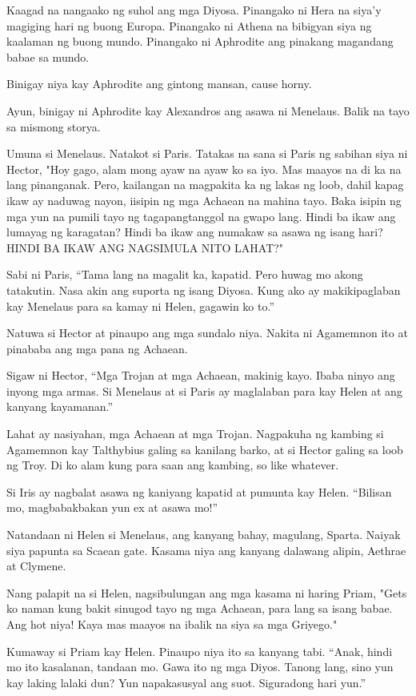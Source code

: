 \documentclass[12pt,letterpaper]{report}
\begin{document}
Kaagad na nangaako ng suhol ang mga Diyosa. Pinangako ni Hera na siya'y magiging hari ng buong Europa. Pinangako ni Athena na bibigyan siya ng kaalaman ng buong mundo. Pinangako ni Aphrodite ang pinakang magandang babae sa mundo.

Binigay niya kay Aphrodite ang gintong mansan, cause horny.

Ayun, binigay ni Aphrodite kay Alexandros ang asawa ni Menelaus. Balik na tayo sa mismong storya.

Umuna si Menelaus. Natakot si Paris. Tatakas na sana si Paris ng sabihan siya ni Hector, "Hoy gago, alam mong ayaw na ayaw ko sa iyo. Mas maayos na di ka na lang pinanganak. Pero, kailangan na magpakita ka ng lakas ng loob, dahil kapag ikaw ay naduwag nayon, iisipin ng mga Achaean na mahina tayo. Baka isipin ng mga yun na pumili tayo ng tagapangtanggol na gwapo lang. Hindi ba ikaw ang lumayag ng karagatan? Hindi ba ikaw ang numakaw sa asawa ng isang hari?
HINDI BA IKAW ANG NAGSIMULA NITO LAHAT?"

Sabi ni Paris, ``Tama lang na magalit ka, kapatid. Pero huwag mo akong tatakutin. Nasa akin ang suporta ng isang Diyosa. Kung ako ay makikipaglaban kay Menelaus para sa kamay ni Helen, gagawin ko to.''

Natuwa si Hector at pinaupo ang mga sundalo niya. Nakita ni Agamemnon ito at pinababa ang mga pana ng Achaean.

Sigaw ni Hector, ``Mga Trojan at mga Achaean, makinig kayo. Ibaba ninyo ang inyong mga armas. Si Menelaus at si Paris ay maglalaban para kay Helen at ang kanyang kayamanan.''

Lahat ay nasiyahan, mga Achaean at mga Trojan. Nagpakuha ng kambing si Agamemnon kay Talthybius galing sa kanilang barko, at si Hector galing sa loob ng Troy. Di ko alam kung para saan ang kambing, so like whatever.

Si Iris ay nagbalat asawa ng kaniyang kapatid at pumunta kay Helen. ``Bilisan mo, magbabakbakan yun ex at asawa mo!''

Natandaan ni Helen si Menelaus, ang kanyang bahay, magulang, Sparta. Naiyak siya papunta sa Scaean gate. Kasama niya ang kanyang dalawang alipin, Aethrae at Clymene.

Nang palapit na si Helen, nagsibulungan ang mga kasama ni haring Priam, "Gets ko naman kung bakit sinugod tayo ng mga Achaean, para lang sa isang babae. Ang hot niya!
Kaya mas maayos na ibalik na siya sa mga Griyego."

Kumaway si Priam kay Helen. Pinaupo niya ito sa kanyang tabi. ``Anak, hindi mo ito kasalanan, tandaan mo. Gawa ito ng mga Diyos. Tanong lang, sino yun kay laking lalaki dun? Yun napakasusyal ang suot. Siguradong hari yun.''
\end{document}
